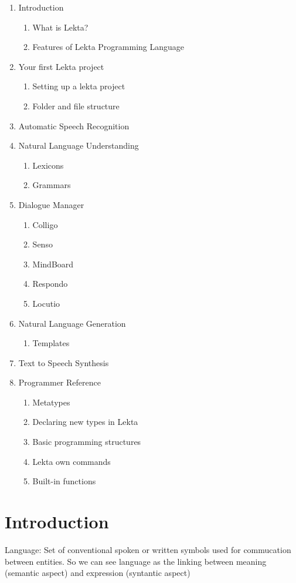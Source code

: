 \documentclass[a4paper,10pt]{article}
\begin{document}
\begin{enumerate}
	\item Introduction
	\begin{enumerate}
		\item What is Lekta?
		\item Features of Lekta Programming Language
	\end{enumerate}
	\item Your first Lekta project
		\begin{enumerate}
			\item Setting up a lekta project
			\item Folder and file structure
		\end{enumerate}
	\item Automatic Speech Recognition
	\item Natural Language Understanding
	\begin{enumerate}
		\item Lexicons
		\item Grammars
	\end{enumerate}
	\item Dialogue Manager
	\begin{enumerate}
		\item Colligo
		\item Senso
		\item MindBoard
		\item Respondo
		\item Locutio
	\end{enumerate}
	\item Natural Language Generation
	\begin{enumerate}
		\item Templates
	\end{enumerate}
	\item Text to Speech Synthesis
	\item Programmer Reference
	\begin{enumerate}
		\item Metatypes
		\item Declaring new types in Lekta
		\item Basic programming structures
		\item Lekta own commands 
		\item Built-in functions
	\end{enumerate}
\end{enumerate}

\section{Introduction}
Language: Set of conventional spoken or written symbols used for commucation between entities.
So we can see language as the linking between meaning (semantic aspect) and expression (syntantic aspect)
\end{document}
